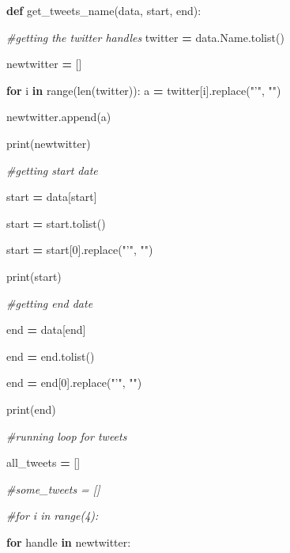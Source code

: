 \documentclass[12pt,twoside]{reedthesis}
\newenvironment{Shaded}{\begin{snugshade}}{\end{snugshade}}
\newcommand{\KeywordTok}[1]{\textcolor[rgb]{0.13,0.29,0.53}{\textbf{#1}}}
\newcommand{\DecValTok}[1]{\textcolor[rgb]{0.00,0.00,0.81}{#1}}
\newcommand{\StringTok}[1]{\textcolor[rgb]{0.31,0.60,0.02}{#1}}
\newcommand{\CommentTok}[1]{\textcolor[rgb]{0.56,0.35,0.01}{\textit{#1}}}
\newcommand{\ControlFlowTok}[1]{\textcolor[rgb]{0.13,0.29,0.53}{\textbf{#1}}}
\newcommand{\OperatorTok}[1]{\textcolor[rgb]{0.81,0.36,0.00}{\textbf{#1}}}
\newcommand{\BuiltInTok}[1]{#1}
\newcommand{\NormalTok}[1]{#1}
\begin{document}
\small
\begin{Shaded}
\begin{Highlighting}[]
\KeywordTok{def}\NormalTok{ get_tweets_name(data, start, end):}
    
    \CommentTok{#getting the twitter handles}
\NormalTok{    twitter }\OperatorTok{=}\NormalTok{ data.Name.tolist()}

\NormalTok{    newtwitter }\OperatorTok{=}\NormalTok{ []}

    \ControlFlowTok{for}\NormalTok{ i }\KeywordTok{in} \BuiltInTok{range}\NormalTok{(}\BuiltInTok{len}\NormalTok{(twitter)):}
\NormalTok{        a }\OperatorTok{=}\NormalTok{ twitter[i].replace(}\StringTok{"'"}\NormalTok{, }\StringTok{""}\NormalTok{)}
    
\NormalTok{        newtwitter.append(a)}
    
    \BuiltInTok{print}\NormalTok{(newtwitter)}
    
    
    
    \CommentTok{#getting start date}
    
\NormalTok{    start }\OperatorTok{=}\NormalTok{ data[start]}
    
\NormalTok{    start }\OperatorTok{=}\NormalTok{ start.tolist()}

\NormalTok{    start }\OperatorTok{=}\NormalTok{ start[}\DecValTok{0}\NormalTok{].replace(}\StringTok{"'"}\NormalTok{, }\StringTok{""}\NormalTok{)}
    
    \BuiltInTok{print}\NormalTok{(start)}
    
    
    \CommentTok{#getting end date}
    
\NormalTok{    end }\OperatorTok{=}\NormalTok{ data[end]}
    
\NormalTok{    end }\OperatorTok{=}\NormalTok{ end.tolist()}

\NormalTok{    end }\OperatorTok{=}\NormalTok{ end[}\DecValTok{0}\NormalTok{].replace(}\StringTok{"'"}\NormalTok{, }\StringTok{""}\NormalTok{)}
    
    \BuiltInTok{print}\NormalTok{(end)}
    
    
    
    \CommentTok{#running loop for tweets}
    
\NormalTok{    all_tweets }\OperatorTok{=}\NormalTok{ []}

    \CommentTok{#some_tweets = []}

    \CommentTok{#for i in range(4):}

    \ControlFlowTok{for}\NormalTok{ handle }\KeywordTok{in}\NormalTok{ newtwitter:}


\end{Highlighting}
\end{Shaded}
\end{document}
